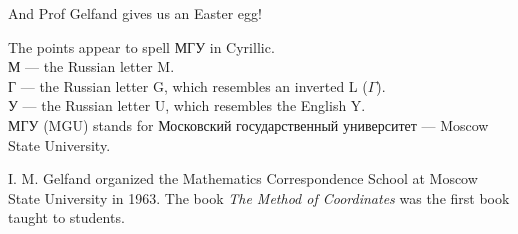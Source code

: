 \documentclass[10pt]{article}
\begin{document}

And Prof Gelfand gives us an Easter egg!

The points appear to spell \foreignlanguage{russian}{МГУ} in Cyrillic.\\
\foreignlanguage{russian}{М} --- the Russian letter M.\\
\foreignlanguage{russian}{Г} --- the Russian letter G, 
which resembles an inverted L ($\Gamma$).\\
\foreignlanguage{russian}{У} --- the Russian letter U, 
which resembles the English Y.\\
\foreignlanguage{russian}{МГУ} (MGU) stands for 
\foreignlanguage{russian}{Московский государственный университет}
--- Moscow State University.

I. M. Gelfand organized the Mathematics Correspondence School at Moscow State University in 1963. The book \textit{The Method of Coordinates} was 
the first book taught to students.
\end{document}
